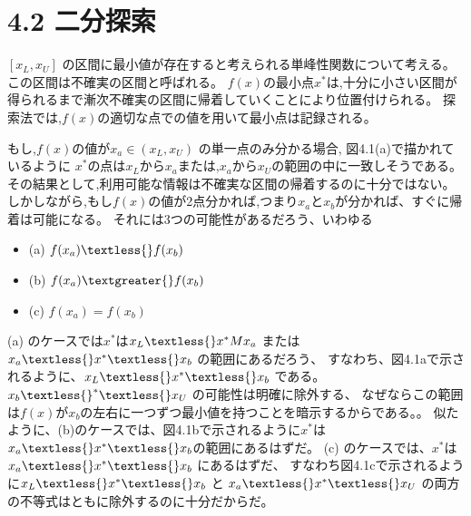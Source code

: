 \section*{4.2 二分探索}\label{4-2-}

$[ x_L, x_U ]$
の区間に最小値が存在すると考えられる単峰性関数について考える。
この区間は不確実の区間と呼ばれる。
$f(x)$の最小点$x^*$は,十分に小さい区間が得られるまで漸次不確実の区間に帰着していくことにより位置付けられる。
探索法では,$f(x)$の適切な点での値を用いて最小点は記録される。

もし,$f(x)$の値が$x_a \in ( x_L , x_U )$
の単一点のみ分かる場合, 図4.1(a)で描かれているように
$x^*$の点は$x_L$から$x_a$または,$x_a$から$x_U$の範囲の中に一致しそうである。
その結果として,利用可能な情報は不確実な区間の帰着するのに十分ではない。
しかしながら,もし$f(x)$の値が2点分かれば,つまり$x_a$と$x_b$が分かれば、すぐに帰着は可能になる。
それには3つの可能性があるだろう、いわゆる

\begin{itemize}
\tightlist
\item
  (a) $ f(x_a) \textless{} f(x_b) $
\item
  (b) $ f(x_a) \textgreater{} f(x_b) $
\item
  (c) $ f(x_a) = f(x_b) $
\end{itemize}

(a) のケースでは$x^{*}$は$ x_L \textless{} x^{*} M x_a $
または $ x_a \textless{} x^{*} \textless{} x_b $
の範囲にあるだろう、 すなわち、図4.1aで示されるように、$ x_L
\textless{} x^{*} \textless{} x_b $ である。 $ x_b
\textless{}^{*} \textless{} x_U $ の可能性は明確に除外する、
なぜならこの範囲は$ f(x)
$が$x_b$の左右に一つずつ最小値を持つことを暗示するからである。。
似たように、(b)のケースでは、図4.1bで示されるように$x^{*}$は$
x_a \textless{} x^{*} \textless{} x_b $の範囲にあるはずだ。 (c)
のケースでは、$x^{*}$は$ x_a \textless{} x^{*} \textless{}
x_b $ にあるはずだ、 すなわち図4.1cで示されるように$ x_L \textless{}
x^{*} \textless{} x_b $ と $ x_a \textless{} x^{*}
\textless{} x_U $ の両方の不等式はともに除外するのに十分だからだ。

